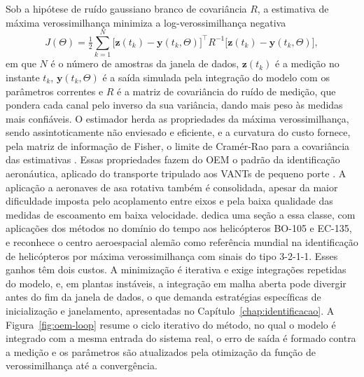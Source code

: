 {Sob a hipótese de ruído gaussiano branco de covariância $R$, a estimativa de máxima verossimilhança minimiza a log-verossimilhança negativa
\begin{equation}
J(\Theta) = \tfrac{1}{2}\sum_{k=1}^{N} \big[\mathbf{z}(t_k) - \mathbf{y}(t_k,\Theta)\big]^{\top} R^{-1} \big[\mathbf{z}(t_k) - \mathbf{y}(t_k,\Theta)\big],
\label{eq:oem-geral}
\end{equation}
em que $N$ é o número de amostras da janela de dados, $\mathbf{z}(t_k)$ é a medição no instante $t_k$, $\mathbf{y}(t_k,\Theta)$ é a saída simulada pela integração do modelo com os parâmetros correntes e $R$ é a matriz de covariância do ruído de medição, que pondera cada canal pelo inverso da sua variância, dando mais peso às medidas mais confiáveis. O estimador herda as propriedades da máxima verossimilhança, sendo assintoticamente não enviesado e eficiente, e a curvatura do custo fornece, pela matriz de informação de Fisher, o limite de Cramér-Rao para a covariância das estimativas \cite{Jategaonkar2015, Klein2006}. Essas propriedades fazem do OEM o padrão da identificação aeronáutica, aplicado do transporte tripulado aos VANTs de pequeno porte \cite{Tischler2012, Niermeyer2015, Matt2025}. A aplicação a aeronaves de asa rotativa também é consolidada, apesar da maior dificuldade imposta pelo acoplamento entre eixos e pela baixa qualidade das medidas de escoamento em baixa velocidade. \textcite{Jategaonkar2015} dedica uma seção a essa classe, com aplicações dos métodos no domínio do tempo aos helicópteros BO-105 e EC-135, e \textcite{Tischler2012} reconhece o centro aeroespacial alemão como referência mundial na identificação de helicópteros por máxima verossimilhança com sinais do tipo 3-2-1-1. Esses ganhos têm dois custos. A minimização é iterativa e exige integrações repetidas do modelo, e, em plantas instáveis, a integração em malha aberta pode divergir antes do fim da janela de dados, o que demanda estratégias específicas de inicialização e janelamento, apresentadas no Capítulo~\ref{chap:identificacao}. A Figura~\ref{fig:oem-loop} resume o ciclo iterativo do método, no qual o modelo é integrado com a mesma entrada do sistema real, o erro de saída é formado contra a medição e os parâmetros são atualizados pela otimização da função de verossimilhança até a convergência.

}
